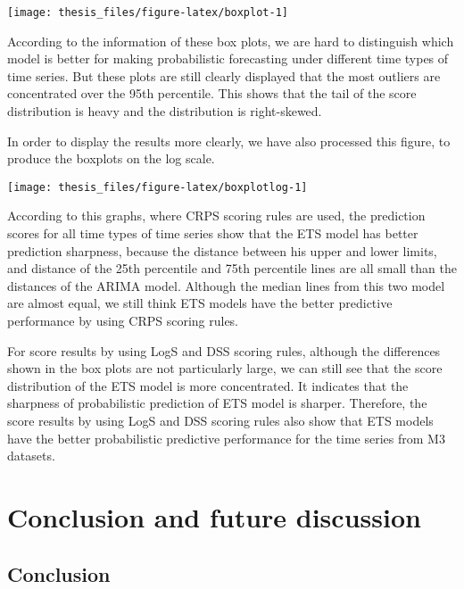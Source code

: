 \documentclass{monashthesis}
\theoremstyle{definition}
\theoremstyle{definition}
\theoremstyle{definition}
\theoremstyle{remark}
\begin{document}
\texttt{[image: thesis\_files/figure-latex/boxplot-1]}

According to the information of these box plots, we are hard to
distinguish which model is better for making probabilistic forecasting
under different time types of time series. But these plots are still
clearly displayed that the most outliers are concentrated over the 95th
percentile. This shows that the tail of the score distribution is heavy
and the distribution is right-skewed.

In order to display the results more clearly, we have also processed
this figure, to produce the boxplots on the log scale.

\texttt{[image: thesis\_files/figure-latex/boxplotlog-1]}

According to this graphs, where CRPS scoring rules are used, the
prediction scores for all time types of time series show that the ETS
model has better prediction sharpness, because the distance between his
upper and lower limits, and distance of the 25th percentile and 75th
percentile lines are all small than the distances of the ARIMA model.
Although the median lines from this two model are almost equal, we still
think ETS models have the better predictive performance by using CRPS
scoring rules.

For score results by using LogS and DSS scoring rules, although the
differences shown in the box plots are not particularly large, we can
still see that the score distribution of the ETS model is more
concentrated. It indicates that the sharpness of probabilistic
prediction of ETS model is sharper. Therefore, the score results by
using LogS and DSS scoring rules also show that ETS models have the
better probabilistic predictive performance for the time series from M3
datasets.

\chapter{Conclusion and future
discussion}\label{conclusion-and-future-discussion}

\section{Conclusion}\label{conclusion}
\end{document}

